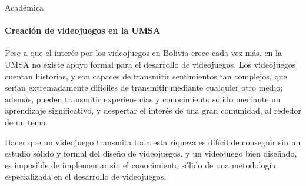 \begin{subsection}{Académica}
  \paragraph{Creación de videojuegos en la UMSA}
  Pese a que el interés por los videojuegos en Bolivia crece cada vez más, en la UMSA no existe apoyo formal para el desarrollo de videojuegos. Los videojuegos cuentan historias, y son capaces de transmitir sentimientos tan complejos, que serían extremadamente difíciles de transmitir mediante cualquier otro medio; además, pueden transmitir experien- cias y conocimiento sólido mediante un aprendizaje significativo, y despertar el interés de una gran comunidad, al rededor de un tema. 

Hacer que un videojuego transmita toda esta riqueza es difícil de conseguir sin un estudio sólido y formal del diseño de videojuegos, y un videojuego bien diseñado, es imposible de implementar sin el conocimiento sólido de una metodología especializada en el desarrollo de videojuegos.
\end{subsection}

